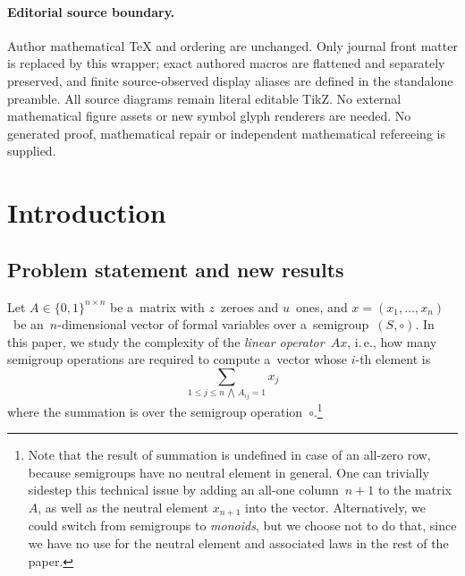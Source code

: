 \documentclass[11pt]{article}
\numberwithin{equation}{section}
\theoremstyle{definition}
\theoremstyle{plain}
\newcommand{\ie}{i.\,e.}
\theoremstyle{plain}\newtheorem{observation}[theorem]{Observation}
\begin{document}
\paragraph{Editorial source boundary.}
Author mathematical TeX and ordering are unchanged. Only journal front matter is replaced by this wrapper; exact authored macros are flattened and separately preserved, and finite source-observed display aliases are defined in the standalone preamble. All source diagrams remain literal editable TikZ. No external mathematical figure assets or new symbol glyph renderers are needed.  No generated proof, mathematical repair or independent mathematical refereeing is supplied. 
\clearpage


\section{Introduction}
\subsection{Problem statement and new results}
%
%

Let $A \in \{0,1\}^{n \times n}$ be a~matrix with $z$~zeroes and $u$~ones, and
$x=(x_1, \dotsc, x_n)$~be an~$n$-dimensional vector of formal variables over
a~semigroup~$(S, \circ)$. In this paper, we study the complexity of the
\emph{linear operator}~$Ax$, \ie, how many semigroup operations are required to
compute a~vector whose $i$-th element is
\begin{equation}\label{eq-problem-statement}
\sum_{1 \le j \le n\,\bigwedge\,A_{ij}=1}x_j
\end{equation}
where the summation is over the semigroup operation~$\circ$.\footnote{Note that
the result of summation is undefined in case of an all-zero row, because
semigroups have no neutral element in general. One can trivially sidestep this
technical issue by adding an all-one column~$n+1$ to the matrix~$A$, as well as
the neutral element $x_{n+1}$ into the vector. Alternatively, we could switch
from semigroups to \emph{monoids}, but we choose not to do that, since we have
no use for the neutral element and associated laws in the rest of the paper.}
\end{document}
